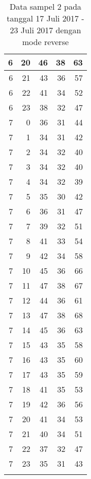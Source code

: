 \begin{longtable}{|r|r|r|r|r|}
    \hline
    6     & 20    & 46    & 38    & 63 \\
    \hline
    6     & 21    & 43    & 36    & 57 \\
    \hline
    6     & 22    & 41    & 34    & 52 \\
    \hline
    6     & 23    & 38    & 32    & 47 \\
    \hline
    7     & 0     & 36    & 31    & 44 \\
    \hline
    7     & 1     & 34    & 31    & 42 \\
    \hline
    7     & 2     & 34    & 32    & 40 \\
    \hline
    7     & 3     & 34    & 32    & 40 \\
    \hline
    7     & 4     & 34    & 32    & 39 \\
    \hline
    7     & 5     & 35    & 30    & 42 \\
    \hline
    7     & 6     & 36    & 31    & 47 \\
    \hline
    7     & 7     & 39    & 32    & 51 \\
    \hline
    7     & 8     & 41    & 33    & 54 \\
    \hline
    7     & 9     & 42    & 34    & 58 \\
    \hline
    7     & 10    & 45    & 36    & 66 \\
    \hline
    7     & 11    & 47    & 38    & 67 \\
    \hline
    7     & 12    & 44    & 36    & 61 \\
    \hline
    7     & 13    & 47    & 38    & 68 \\
    \hline
    7     & 14    & 45    & 36    & 63 \\
    \hline
    7     & 15    & 43    & 35    & 58 \\
    \hline
    7     & 16    & 43    & 35    & 60 \\
    \hline
    7     & 17    & 43    & 35    & 59 \\
    \hline
    7     & 18    & 41    & 35    & 53 \\
    \hline
    7     & 19    & 42    & 36    & 56 \\
    \hline
    7     & 20    & 41    & 34    & 53 \\
    \hline
    7     & 21    & 40    & 34    & 51 \\
    \hline
    7     & 22    & 37    & 32    & 47 \\
    \hline
    7     & 23    & 35    & 31    & 43 \\
    \hline
    
  \caption{Data sampel 2 pada tanggal 17 Juli 2017 - 23 Juli 2017 dengan mode reverse}
  \label{tab:datasample217072017reverse}%
\end{longtable}%

